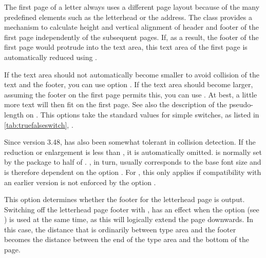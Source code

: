 \begin{Declaration}
\end{Declaration}
\begin{Explain}
  The first page of a letter always uses a different page layout because of
  the many predefined elements such as the letterhead or the address. The
   class provides a mechanism to calculate height and vertical
  alignment of header and footer of the first page independently of the
  subsequent pages. If, as a result, the footer of the first page would
  protrude into the text area, this text area of the first page is
  automatically reduced using
  .
\end{Explain}
If the text area
should not automatically become smaller to avoid collision of the text and the
footer, you can use option %
.  If the text area should
become larger, assuming the footer on the first page permits this, you can use
%
. At best, a little more text
will then fit on the first page. See also the description of the
 pseudo-length on
.  This options take the
standard values for simple switches, as listed in
\autoref{tab:truefalseswitch}, .

Since version 3.48,
\KOMAScript{} has also been somewhat tolerant in collision detection. If the
reduction or enlargement is less than , it is automatically
omitted.  is normally set by the  package
to half of . , in turn, usually corresponds to
the base font size and is therefore dependent on the option
. For , this only applies
if compatibility with an earlier version is not enforced by the option
.%
\EndIndexGroup


\begin{Declaration}
\end{Declaration}
%
This option determines whether the footer
for the letterhead page is output. Switching off the letterhead page footer
with ,
has an effect when the  option
(see ) is used at the same
time, as this will logically extend the page downwards. In this case, the
distance that is ordinarily between type area and the footer becomes the
distance between the end of the type area and the bottom of the page.

